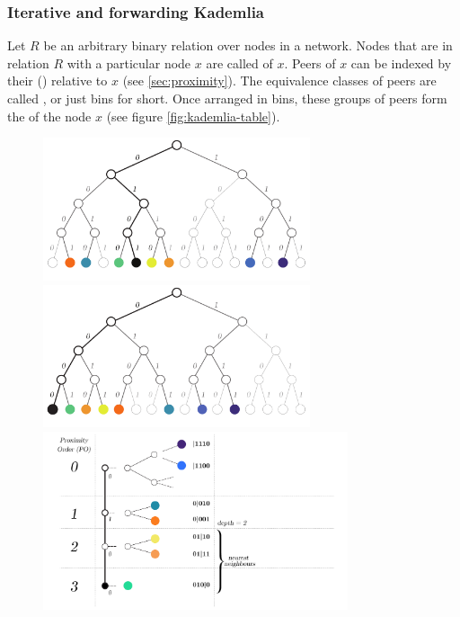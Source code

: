 \subsubsection{Iterative and forwarding Kademlia}

Let $R$ be an arbitrary binary relation over nodes in a network. Nodes that are in relation $R$ with a particular node $x$ are called  of $x$. Peers of $x$ can be indexed by their  () relative to $x$ (see \ref{sec:proximity}).
The equivalence classes of peers are called , or just bins for short. Once arranged in bins, these groups of peers form the  of the node $x$ (see figure \ref{fig:kademlia-table}). 



\begin{figure}[htbp]
   \centering
    \includegraphics[width=0.7\textwidth]{fig/kademlia.pdf}
    \includegraphics[width=0.7\textwidth]{fig/kademlia-2.pdf}
    \includegraphics[width=0.8\textwidth]{fig/kademlia-3.pdf}

\end{figure}
